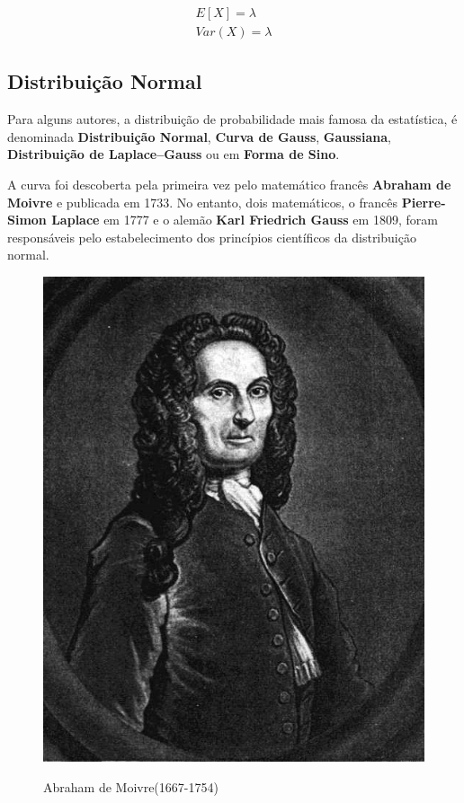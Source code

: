 $$
\begin{aligned}
E\left[X\right] =\lambda \\
Var\left(X\right) = \lambda
\end{aligned}
$$
 



\subsection{Distribuição Normal}

Para alguns autores, a distribuição de probabilidade mais famosa da estatística, é denominada \textbf{Distribuição Normal}, \textbf{Curva de Gauss}, \textbf{Gaussiana}, \textbf{Distribuição de Laplace–Gauss} ou em \textbf{Forma de Sino}.\vskip0.3cm 


A curva foi descoberta pela primeira vez pelo matemático francês \textbf{Abraham de Moivre} e publicada em 1733. No entanto, dois matemáticos, o francês \textbf{Pierre-Simon Laplace} em 1777 e o alemão \textbf{Karl Friedrich Gauss} em 1809, foram responsáveis pelo estabelecimento dos princípios científicos da distribuição normal.\vskip0.3cm 

\begin{figure}
    \centering
    \caption{Abraham de Moivre(1667-1754)} 
    \centering
\includegraphics[scale=0.2]{figures/Abraham_de_moivre.jpeg}
    \label{fig:my_label6} 
\end{figure}

